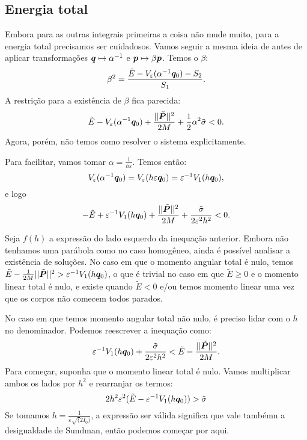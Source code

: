 \subsection{Energia total}
Embora para as outras integrais primeiras a coisa não mude muito, para a energia total precisamos ser cuidadosos. Vamos seguir a mesma ideia de antes de aplicar transformações $\bm q \mapsto \alpha^{-1}$ e $\bm p \mapsto \beta \bm p$. Temos o $\beta$:
\begin{equation}
    \beta^2 = \dfrac{\tilde E - V_\varepsilon(\alpha^{-1} \bm q_0) - S_2}{S_1}.
\end{equation}
A restrição para a existência de $\beta$ fica parecida:
\begin{equation}
    \tilde E - V_{\varepsilon}(\alpha^{-1} \bm q_0) + \dfrac{||\tilde{\bm P}||^2}{2M} + \dfrac{1}{2} \alpha^2 \tilde \sigma < 0.
\end{equation}
Agora, porém, não temos como resolver o sistema explicitamente.

Para facilitar, vamos tomar $\alpha = \frac{1}{h \varepsilon}$. Temos então:
\begin{equation}
    V_\varepsilon(\alpha^{-1} \bm q_0) 
    = V_\varepsilon(h \varepsilon \bm q_0) 
    = \varepsilon^{-1} V_1(h \bm q_0),
\end{equation}
e logo
\begin{equation}
    - \tilde E + \varepsilon^{-1} V_1(h \bm q_0) + \dfrac{||\tilde{\bm P}||^2}{2M} + \dfrac{\tilde \sigma}{2 \varepsilon^2 h^2} < 0.
\end{equation}

Seja $f(h)$ a expressão do lado esquerdo da inequação anterior. Embora não tenhamos uma parábola como no caso homogêneo, ainda é possível analisar a existência de soluções. No caso em que o momento angular total é nulo, temos $\tilde E - \frac{1}{2M} ||\tilde{\bm P}||^2 > \varepsilon^{-1} V_1 (h \bm q_0)$, o que é trivial no caso em que $\tilde E \geq 0$ e o momento linear total é nulo, e existe quando $\tilde E < 0$ e/ou temos momento linear uma vez que os corpos não comecem todos parados.

No caso em que temos momento angular total não nulo, é preciso lidar com o $h$ no denominador. Podemos reescrever a inequação como:
\begin{equation}
    \varepsilon^{-1} V_1 (h \bm q_0) + \dfrac{\tilde \sigma}{2 \varepsilon^2 h^2} < \tilde E - \dfrac{||\tilde{\bm P}||^2}{2M}.
\end{equation}
Para começar, suponha que o momento linear total é nulo. Vamos multiplicar ambos os lados por $h^2$ e rearranjar os termos:
\begin{equation}
    2 h^2 \varepsilon^2 (\tilde E - \varepsilon^{-1} V_1 (h \bm q_0))
    > \tilde \sigma
\end{equation}
Se tomamos $h = \frac{1}{\varepsilon \sqrt(2 I_0)}$, a expressão ser válida significa que vale tambémn a desigualdade de Sundman, então podemos começar por aqui. 

